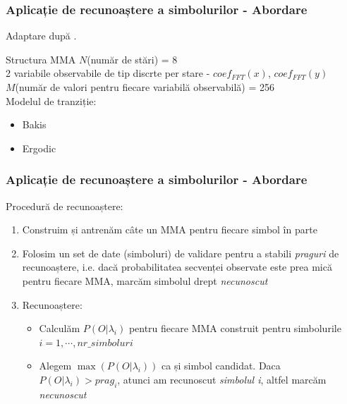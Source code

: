 \begin{frame}
	\frametitle{Aplicație de recunoaștere a simbolurilor - Abordare}
	Adaptare după \citep{yang1994hidden}.
	
	\begin{block}{Structura MMA}
		$N$(număr de stări) = 8\\
		2 variabile observabile de tip discrte per stare - $coef_{FFT}(x)$, $coef_{FFT}(y)$\\
		$M$(număr de valori pentru fiecare variabilă observabilă) = 256\\
		Modelul de tranziție:\\
		\begin{itemize}
			\item Bakis
			\item Ergodic
		\end{itemize}
	\end{block}
\end{frame}

\begin{frame}
	\frametitle{Aplicație de recunoaștere a simbolurilor - Abordare}
	
	Procedură de recunoaștere:
	\begin{enumerate}
		\item Construim și antrenăm câte un MMA pentru fiecare simbol în parte
		\vspace*{0.5em}
		\pause
		\item Folosim un set de date (simboluri) de validare pentru a stabili \emph{praguri} de recunoaștere, i.e. 
				dacă probabilitatea secvenței observate este prea mică pentru fiecare MMA, marcăm simbolul drept 
				\emph{necunoscut}
		\vspace*{0.5em}
		\pause
		\item Recunoaștere:
			\begin{itemize}
				\item Calculăm $P(O \vert \lambda_i)$ pentru fiecare MMA construit pentru simbolurile 
				$i=1,\cdots,nr\_simboluri$
				\item Alegem $\max(P(O \vert \lambda_i))$ ca și simbol candidat. 
				Daca $P(O \vert \lambda_i) > prag_i$, atunci am recunoscut \emph{simbolul i}, 
				altfel marcăm \emph{necunoscut}
			\end{itemize}
	\end{enumerate}
	
\end{frame}


